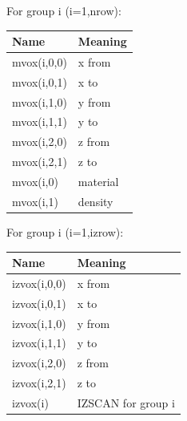 \documentclass[12pt]{book}
\begin{document}
\noindent For group i (i=1,nrow):

\begin{tabular} {|p{1.5in}|p{3.75in}|}
\hline
Name & Meaning \\ \hline
mvox(i,0,0) & x from    \\
mvox(i,0,1) & x to  \\
mvox(i,1,0) & y from  \\
mvox(i,1,1) & y to  \\
mvox(i,2,0) & z from  \\
mvox(i,2,1) & z to  \\
mvox(i,0) & material \\
mvox(i,1) & density \\ \hline
\end{tabular}

\noindent For group i (i=1,izrow):

\begin{tabular} {|p{1.5in}|p{3.75in}|}
\hline
Name & Meaning \\ \hline
izvox(i,0,0) & x from    \\
izvox(i,0,1) & x to  \\
izvox(i,1,0) & y from  \\
izvox(i,1,1) & y to  \\
izvox(i,2,0) & z from  \\
izvox(i,2,1) & z to  \\
izvox(i) & IZSCAN for group i \\ \hline
\end{tabular}
\end{document}
